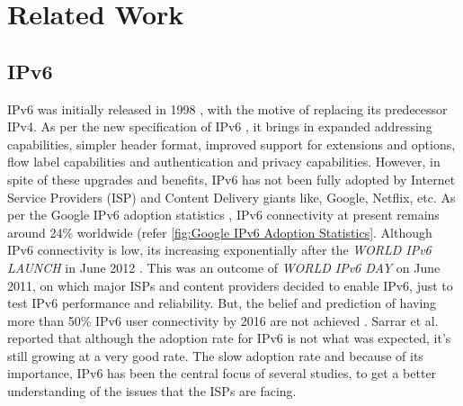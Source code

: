 \chapter{Related Work}\label{chapter:Related Work}

\section*{IPv6}

IPv6 was initially released in 1998 \cite{rfc2460}, with the motive of replacing its predecessor IPv4. As per the new specification of IPv6 \cite{rfc8200}, it brings in expanded addressing capabilities,
simpler header format, improved support for extensions and options, flow label capabilities and authentication and privacy capabilities. However, in spite of these upgrades and benefits, IPv6 has not been fully adopted by Internet Service Providers (ISP)
and Content Delivery giants like, Google, Netflix, etc. As per the Google IPv6 adoption statistics \cite{gv6}, IPv6 connectivity at present remains around 24\% worldwide (refer \cref{fig:Google IPv6 Adoption Statistics}. 
Although IPv6 connectivity is low, its increasing exponentially after the \textit{WORLD IPv6 LAUNCH} in June 2012 \cite{ipv6day}. This was an outcome of \textit{WORLD IPv6 DAY} on June 2011, on which major ISPs and content providers decided to enable IPv6, just to test IPv6 performance
and reliability. But, the belief and prediction of having more than 50\% IPv6 user connectivity by 2016 are not achieved \cite{ipv6day}. Sarrar et al. \cite{sarraripv6} reported that although the adoption rate for IPv6 is not what was expected, it's still growing at a
very good rate. The slow adoption rate and because of its importance, IPv6 has been the central focus of several studies, to get a better understanding of the issues that the ISPs are facing.

